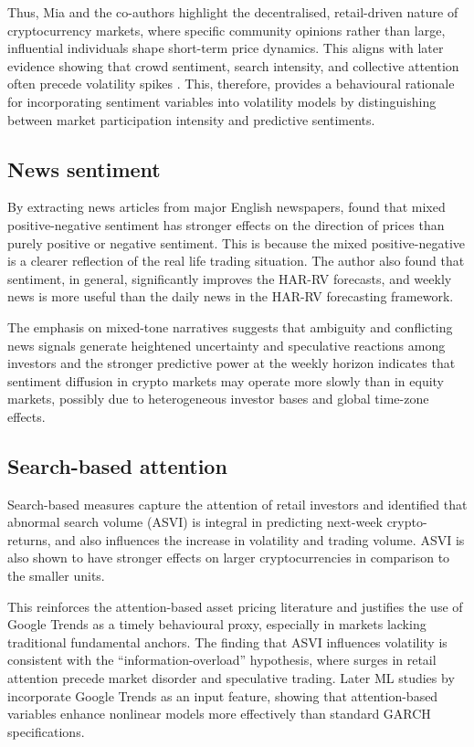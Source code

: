 \documentclass[12pt]{report}
\begin{document}
Thus, Mia and the co-authors highlight the decentralised, retail-driven nature of cryptocurrency markets, where specific community opinions rather than large, influential individuals shape short-term price dynamics. This aligns with later evidence showing that crowd sentiment, search intensity, and collective attention often precede volatility spikes \citep{wang2023cryptoML}. This, therefore, provides a behavioural rationale for incorporating sentiment variables into volatility models by distinguishing between market participation intensity and predictive sentiments.


\subsection{News sentiment}

By extracting news articles from major English newspapers, \cite{sapkota2022newsbitcoin} found that mixed positive-negative sentiment has stronger effects on the direction of prices than purely positive or negative sentiment. This is because the mixed positive-negative is a clearer reflection of the real life trading situation. The author also found that sentiment, in general, significantly improves the HAR-RV forecasts, and weekly news is more useful than the daily news in the HAR-RV forecasting framework.

The emphasis on mixed-tone narratives suggests that ambiguity and conflicting news signals generate heightened uncertainty and speculative reactions among investors and the stronger predictive power at the weekly horizon indicates that sentiment diffusion in crypto markets may operate more slowly than in equity markets, possibly due to heterogeneous investor bases and global time-zone effects.

\subsection{Search-based attention}

Search-based measures capture the attention of retail investors and
\cite{hoangvo2024googleattention} identified that abnormal search volume (ASVI) is integral in predicting next-week crypto-returns, and also influences the increase in volatility and trading volume. ASVI is also shown to have stronger effects on larger cryptocurrencies in comparison  to the smaller units.

This reinforces the attention-based asset pricing literature and justifies the use of Google Trends as a timely behavioural proxy, especially in markets lacking traditional fundamental anchors. The finding that ASVI influences volatility is consistent with the “information-overload” hypothesis, where surges in retail attention precede market disorder 
and speculative trading. Later ML studies by \citep{wang2023cryptoML} incorporate Google Trends as an input feature, showing that attention-based variables enhance nonlinear models more effectively than standard GARCH specifications.
\end{document}
